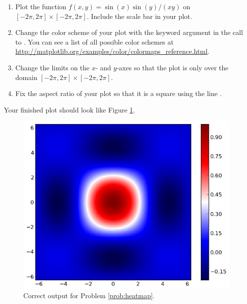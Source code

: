 \begin{problem}\label{prob:heatmap}
\leavevmode
\begin{enumerate}
\item Plot the function $f(x,y) = \sin(x)\sin(y)/(xy)$ on $[-2\pi,2\pi] \times [-2\pi,2\pi]$. 
Include the scale bar in your plot.
\item Change the color scheme of your plot with the keyword argument  in the call to . 
You can see a list of all possible color schemes at \url{http://matplotlib.org/examples/color/colormaps_reference.html}.
\item Change the limits on the $x$- and $y$-axes so that the plot is only over the domain $[-2\pi,2\pi] \times [-2\pi,2\pi]$.
\item Fix the aspect ratio of your plot so that it is a square using the line .
\end{enumerate}
Your finished plot should look like Figure \ref{fig:heatmapProb}.

\begin{figure}[H]
\includegraphics[width=.7\textwidth]{pcolor2.png}
\caption{Correct output for Problem \ref{prob:heatmap}.}
\label{fig:heatmapProb}
\end{figure}
\end{problem}

